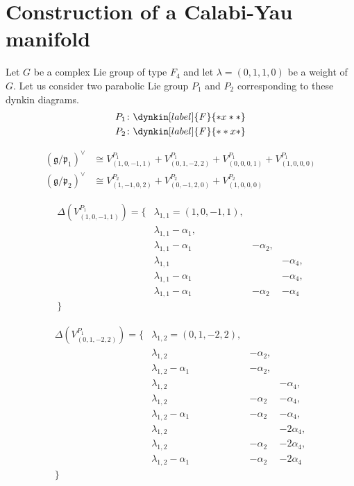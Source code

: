 \documentclass[uplatex,dvipdfmx]{jsarticle}
\begin{document}
\section{Construction of a Calabi-Yau manifold}

Let
$G$
be a complex Lie group of type
$F_4$
and let
$\lambda = \left( 0, 1, 1, 0 \right)$
be a weight
of
$G$.
Let us consider two parabolic Lie group
$P_1$
and
$P_2$
corresponding to these dynkin diagrams.
\begin{align}
    P_1\colon \dynkin[label]{F}{*x**} \\
    P_2\colon \dynkin[label]{F}{**x*}
\end{align}


\begin{align}
    \left( \mathfrak{g}/\mathfrak{p_1} \right)^\vee
    &\cong
    V^{P_1}_{(1, 0, -1, 1)}
    +
    V^{P_1}_{(0, 1, -2, 2)}
    +
    V^{P_1}_{(0, 0, 0, 1)}
    +
    V^{P_1}_{(1, 0, 0, 0)} \\
    \left( \mathfrak{g}/\mathfrak{p_2} \right)^\vee
    &\cong
    V^{P_2}_{(1, -1, 0, 2)}
    +
    V^{P_2}_{(0, -1, 2, 0)}
    +
    V^{P_2}_{(1, 0, 0, 0)}
\end{align}


\begin{equation}
    \begin{alignedat}{2}
        \Delta\left( V^{P_1}_{(1, 0, -1, 1)} \right)
        =
        \{ 
            &\lambda_{1, 1} = (1, 0, -1, 1),\\
            &\lambda_{1, 1} - \alpha_1,\\
            &\lambda_{1, 1} - \alpha_1 &- \alpha_2,\\
            &\lambda_{1, 1} &&- \alpha_4,\\
            &\lambda_{1, 1} - \alpha_1 &&- \alpha_4,\\
            &\lambda_{1, 1} - \alpha_1 &- \alpha_2 &- \alpha_4\\
        \}
    \end{alignedat}
\end{equation}

\begin{equation}
    \begin{alignedat}{2}
        \Delta\left( V^{P_1}_{(0, 1, -2, 2)} \right)
        =
        \{
            &\lambda_{1,2} = (0, 1, -2, 2),\\
            &\lambda_{1,2} &- \alpha_2,\\
            &\lambda_{1,2} - \alpha_1 &- \alpha_2,\\
            &\lambda_{1,2} &&- \alpha_4,\\
            &\lambda_{1,2} &- \alpha_2 &- \alpha_4,\\
            &\lambda_{1,2} - \alpha_1 &- \alpha_2 &- \alpha_4,\\
            &\lambda_{1,2} &&- 2\alpha_4,\\
            &\lambda_{1,2} &- \alpha_2 &- 2\alpha_4,\\
            &\lambda_{1,2} - \alpha_1 &- \alpha_2 &- 2\alpha_4\\
            \}
    \end{alignedat}
\end{equation}
\end{document}
